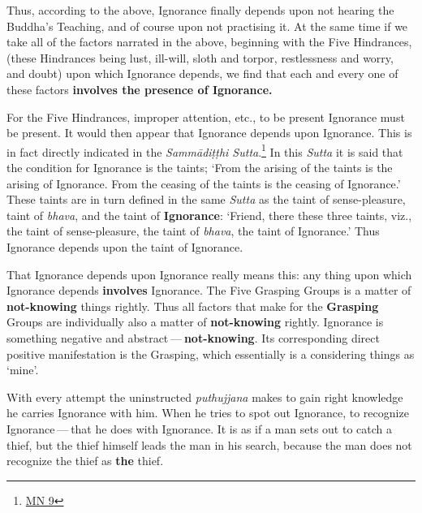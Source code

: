 Thus, according to the above, Ignorance finally depends upon not hearing the Buddha's Teaching, and of course upon not practising it. At the same time if we take all of the factors narrated in the above, beginning with the Five Hindrances, (these Hindrances being lust, ill-will, sloth and torpor, restlessness and worry, and doubt) upon which Ignorance depends, we find that each and every one of these factors \textbf{involves the presence of Ignorance.}

For the Five Hindrances, improper attention, etc., to be present Ignorance must be present. It would then appear that Ignorance depends upon Ignorance. This is in fact directly indicated in the \emph{Sammādiṭṭhi Sutta}.\footnote{\href{https://suttacentral.net/mn9/en/bodhi}{MN 9}} In this \emph{Sutta} it is said that the condition for Ignorance is the taints; `From the arising of the taints is the arising of Ignorance. From the ceasing of the taints is the ceasing of Ignorance.' These taints are in turn defined in the same \emph{Sutta} as the taint of sense-pleasure, taint of \emph{bhava}, and the taint of \textbf{Ignorance}: `Friend, there these three taints, viz., the taint of sense-pleasure, the taint of \emph{bhava}, the taint of Ignorance.' Thus Ignorance depends upon the taint of Ignorance.

That Ignorance depends upon Ignorance really means this: any thing upon which Ignorance depends \textbf{involves} Ignorance. The Five Grasping Groups is a matter of \textbf{not-knowing} things rightly. Thus all factors that make for the \textbf{Grasping} Groups are individually also a matter of \textbf{not-knowing} rightly. Ignorance is something negative and abstract --- \textbf{not-knowing}. Its corresponding direct positive manifestation is the Grasping, which essentially is a considering things as `mine'.

With every attempt the uninstructed \emph{puthujjana} makes to gain right knowledge he carries Ignorance with him. When he tries to spot out Ignorance, to recognize Ignorance --- that he does with Ignorance. It is as if a man sets out to catch a thief, but the thief himself leads the man in his search, because the man does not recognize the thief as \textbf{the} thief.

